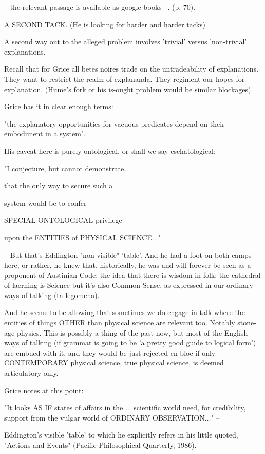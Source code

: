 \documentclass[10pt,titlepage]{book}
\begin{document}
{-- the relevant passage is available as google books --. (p. 70).

A SECOND TACK. (He is looking for harder and harder tacks)

A second way out to the alleged problem involves 'trivial' versus
'non-trivial' explanations.

Recall that for Grice all betes noires trade on the untradeability of
explanations. They want to restrict the realm of explananda. They
regiment our hopes for explanation. (Hume's fork or his is-ought
problem would be similar blockages).

Grice has it in clear enough terms:

"the explanatory opportunities for vacuous predicates depend on their
embodiment in a system".

His caveat here is purely ontological, or shall we say eschatological:

"I conjecture, but cannot demonstrate,

that the only way to secure such a

system would be to confer

SPECIAL ONTOLOGICAL privilege

upon the ENTITIES of PHYSICAL SCIENCE..."

-- But that's Eddington "non-visible" 'table'. And he had a foot on
both camps here, or rather, he knew that, historically, he was and will
forever be seen as a proponent of Austinian Code: the idea that there
is wisdom in folk: the cathedral of laerning is Science but it's also
Common Sense, as expressed in our ordinary ways of talking (ta
legomena).

And he seems to be allowing that sometimes we do engage in talk where
the entities of things OTHER than physical science are relevant too.
Notably stone-age physics. This is possibly a thing of the past now,
but most of the English ways of talking (if grammar is going to be 'a
pretty good guide to logical form') are embued with it, and they would
be just rejected en bloc if only CONTEMPORARY physical science, true
physical science, is deemed articulatory only.

Grice notes at this point:

"It looks AS IF states of affairs in the
... scientific world need, for credibility,
support from the vulgar world of ORDINARY OBSERVATION..." --

Eddington's visible 'table' to which he explicitly refers in his
little quoted, "Actions and Events" (Pacific Philosophical Quarterly,
1986).

}
\end{document}
